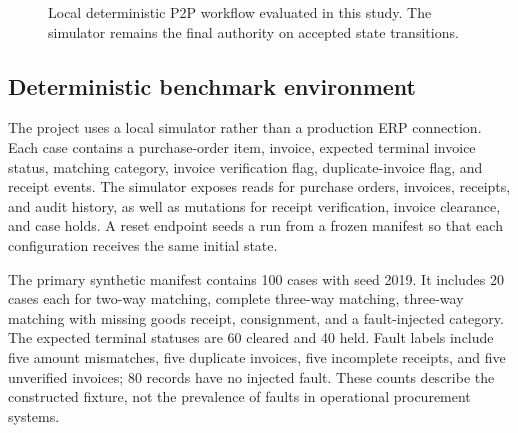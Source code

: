 \documentclass[conference]{IEEEtran}
\begin{document}
\begin{figure}[t]
\centering
{}
\caption{Local deterministic P2P workflow evaluated in this study. The simulator remains the final authority on accepted state transitions.}
\label{fig:architecture}
\end{figure}

\subsection{Deterministic benchmark environment}

The project uses a local simulator rather than a production ERP connection. Each case contains a purchase-order item, invoice, expected terminal invoice status, matching category, invoice verification flag, duplicate-invoice flag, and receipt events. The simulator exposes reads for purchase orders, invoices, receipts, and audit history, as well as mutations for receipt verification, invoice clearance, and case holds. A reset endpoint seeds a run from a frozen manifest so that each configuration receives the same initial state.

The primary synthetic manifest contains 100 cases with seed 2019. It includes 20 cases each for two-way matching, complete three-way matching, three-way matching with missing goods receipt, consignment, and a fault-injected category. The expected terminal statuses are 60 cleared and 40 held. Fault labels include five amount mismatches, five duplicate invoices, five incomplete receipts, and five unverified invoices; 80 records have no injected fault. These counts describe the constructed fixture, not the prevalence of faults in operational procurement systems.
\end{document}
